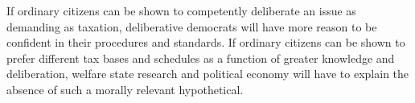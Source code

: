 If ordinary citizens can be shown to competently deliberate an issue as demanding as taxation, deliberative democrats will have more reason to be confident in their procedures and standards.
If ordinary citizens can be shown to prefer different tax bases and schedules as a function of greater knowledge and deliberation, welfare state research and political economy will have to explain the absence of such a morally relevant hypothetical.



